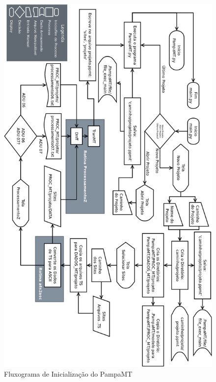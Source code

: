     
    \begin{figure}[H]
                \caption{Fluxograma de Inicialização do PampaMT}
                \begin{center}
                    \includegraphics[width=13cm]{texto/fig/mainpy.png} 
                \end{center}
                \label{fig_influ_mainpy} 
            \end{figure}
            
